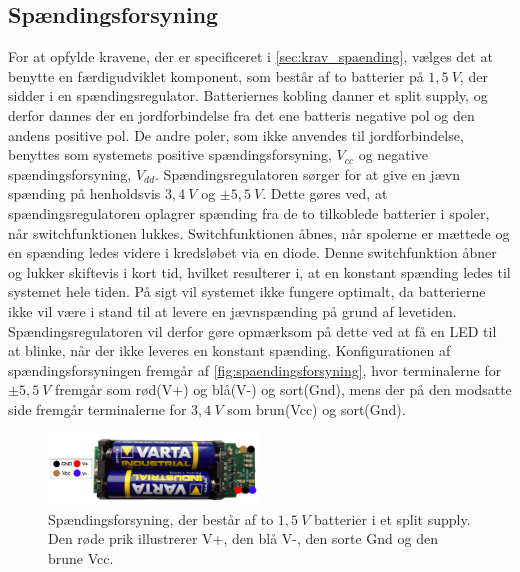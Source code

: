 \subsection{Spændingsforsyning}
For at opfylde kravene, der er specificeret i \autoref{sec:krav_spaending}, vælges det at benytte en færdigudviklet komponent, som består af to batterier på $1,5~V$, der sidder i en spændingsregulator. Batteriernes kobling danner et split supply, og derfor dannes der en jordforbindelse fra det ene batteris negative pol og den andens positive pol. De andre poler, som ikke anvendes til jordforbindelse, benyttes som systemets positive spændingsforsyning, ${V}_{cc}$ og negative spændingsforsyning, ${V}_{dd}$.
Spændingsregulatoren sørger for at give en jævn spænding på henholdsvis $3,4~V$ og $\pm 5,5~V$. Dette gøres ved, at spændingsregulatoren oplagrer spænding fra de to tilkoblede batterier i spoler, når switchfunktionen lukkes. Switchfunktionen åbnes, når spolerne er mættede og en spænding ledes videre i kredsløbet via en diode. Denne switchfunktion åbner og lukker skiftevis i kort tid, hvilket resulterer i, at en konstant spænding ledes til systemet hele tiden. På sigt vil systemet ikke fungere optimalt, da batterierne ikke vil være i stand til at levere en jævnspænding på grund af levetiden. Spændingsregulatoren vil derfor gøre opmærksom på dette ved at få en LED til at blinke, når der ikke leveres en konstant spænding. 
Konfigurationen af spændingsforsyningen fremgår af \autoref{fig:spaendingsforsyning}, hvor terminalerne for $\pm 5,5~V$ fremgår som rød(V+) og blå(V-) og sort(Gnd), mens der på den modsatte side fremgår terminalerne for $3,4~V$ som brun(Vcc) og sort(Gnd). 

\begin{figure}[H]
\centering
\includegraphics[width=0.5\textwidth]{figures/spaendingsforsyning}
\caption{Spændingsforsyning, der består af to $1,5~V$ batterier i et split supply. Den røde prik illustrerer V+, den blå V-, den sorte Gnd og den brune Vcc.}
\label{fig:spaendingsforsyning}
\end{figure}

